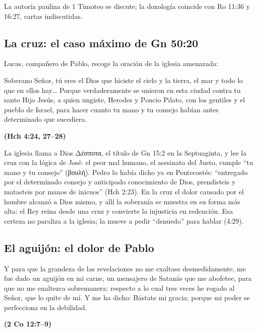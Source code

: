 \documentclass[11pt,letterpaper]{article}
\newcommand{\grc}[1]{\foreignlanguage{ancientgreek}{#1}}
\newcommand{\fuente}[1]{\par\hfill{\upshape\bfseries\small\textcolor{azul}{#1}}}
\begin{document}
\begin{nota}[Precisión]
La autoría paulina de 1 Timoteo se discute; la doxología coincide con Ro 11:36 y 16:27, cartas indiscutidas.
\end{nota}

\subsection{La cruz: el caso máximo de Gn 50:20}
Lucas, compañero de Pablo, recoge la oración de la iglesia amenazada:

\begin{cita}Soberano Señor, tú eres el Dios que hiciste el cielo y la tierra, el mar y todo lo que en ellos hay\ldots{} Porque verdaderamente se unieron en esta ciudad contra tu santo Hijo Jesús, a quien ungiste, Herodes y Poncio Pilato, con los gentiles y el pueblo de Israel, para hacer cuanto tu mano y tu consejo habían antes determinado que sucediera.\fuente{(Hch 4:24, 27--28)}\end{cita}

La iglesia llama a Dios \grc{Δέσποτα}, el título de Gn 15:2 en la Septuaginta, y lee la cruz con la lógica de José: el peor mal humano, el asesinato del Justo, cumple ``tu mano y tu consejo'' (\grc{βουλή}). Pedro lo había dicho ya en Pentecostés: ``entregado por el determinado consejo y anticipado conocimiento de Dios, prendisteis y matasteis por manos de inicuos'' (Hch 2:23). En la cruz el dolor causado por el hombre alcanzó a Dios mismo, y allí la soberanía se muestra en su forma más alta: el Rey reina desde una cruz y convierte la injusticia en redención. Esa certeza no paraliza a la iglesia; la mueve a pedir ``denuedo'' para hablar (4:29).

\subsection{El aguijón: el dolor de Pablo}
\begin{cita}Y para que la grandeza de las revelaciones no me exaltase desmedidamente, me fue dado un aguijón en mi carne, un mensajero de Satanás que me abofetee, para que no me enaltezca sobremanera; respecto a lo cual tres veces he rogado al Señor, que lo quite de mí. Y me ha dicho: Bástate mi gracia; porque mi poder se perfecciona en la debilidad.\fuente{(2 Co 12:7--9)}\end{cita}
\end{document}
